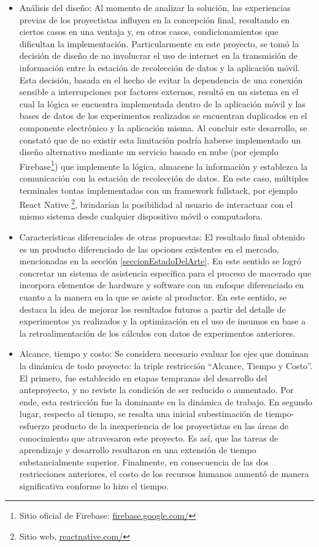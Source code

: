 \begin{itemize}
        \item{Análisis del diseño:} Al momento de analizar la solución, las experiencias previas de los proyectistas influyen en la concepción final, resultando en ciertos casos en una ventaja y, en otros casos, condicionamientos que dificultan la implementación. Particularmente en este proyecto, se tomó la decisión de diseño de no involucrar el uso de internet en la transmisión de información entre la estación de recolección de datos y la aplicación móvil. Esta decisión, basada en el hecho de evitar la dependencia de una conexión sensible a interrupciones por factores externos, resultó en un sistema en el cual la lógica se encuentra implementada dentro de la aplicación móvil y las bases de datos de los experimentos realizados se encuentran duplicados en el componente electrónico y la aplicación misma. Al concluir este desarrollo, se constató que de no existir esta limitación podría haberse implementado un diseño alternativo mediante un servicio basado en nube (por ejemplo Firebase\footnote{Sitio oficial de Firebase: \url{firebase.google.com/}}) que implemente la lógica, almacene la información y establezca la comunicación con la estación de recolección de datos. En este caso, múltiples terminales tontas implementadas con un framework fullstack, por ejemplo React Native \footnote{Sitio web, \url{reactnative.com/}}, brindarían la posibilidad al usuario de interactuar con el mismo sistema desde cualquier dispositivo móvil o computadora. 
        
        \item{Características diferenciales de otras propuestas:}
        El resultado final obtenido es un producto diferenciado de las opciones existentes en el mercado, mencionadas en la sección \ref{seccionEstadoDelArte}. En este sentido se logró concretar un sistema de asistencia específica para el proceso de macerado que incorpora elementos de hardware y software con un enfoque diferenciado en cuanto a la manera en la que se asiste al productor. En este sentido, se destaca la idea de mejorar los resultados futuros a partir del detalle de experimentos ya realizados y la optimización en el uso de insumos en base a la retroalimentación de los cálculos con datos de experimentos anteriores. 
        
        \item{ Alcance, tiempo y costo: } Se considera necesario evaluar los ejes que dominan la dinámica de todo proyecto: la triple restricción ``Alcance, Tiempo y Costo''. El primero, fue establecido en etapas tempranas del desarrollo del anteproyecto, y no reviste la condición de ser reducido o aumentado. Por ende, esta restricción fue la dominante en la dinámica de trabajo. En segundo lugar, respecto al tiempo, se resalta una inicial subestimación de tiempo-esfuerzo producto de la inexperiencia de los proyectistas en las áreas de conocimiento que atravesaron este proyecto. Es así, que las tareas de aprendizaje y desarrollo resultaron en una extensión de tiempo substancialmente superior. Finalmente, en consecuencia de las dos restricciones anteriores, el costo de los recursos humanos aumentó de manera significativa conforme lo hizo el tiempo.
        

\end{itemize}
